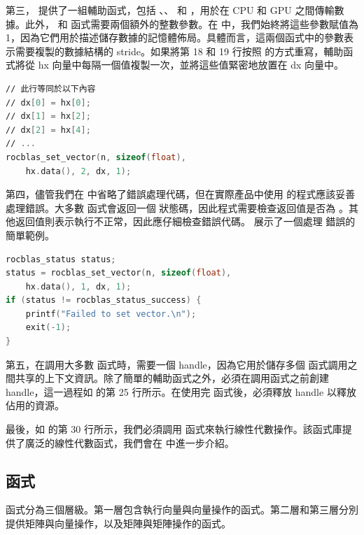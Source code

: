 第三， 提供了一組輔助函式，包括 、、 和 ，用於在 CPU 和 GPU 之間傳輸數據。此外， 和  函式需要兩個額外的整數參數。在  中，我們始終將這些參數賦值為 1，因為它們用於描述儲存數據的記憶體佈局。具體而言，這兩個函式中的參數表示需要複製的數據結構的 stride。如果將第 18 和 19 行按照  的方式重寫，輔助函式將從 hx 向量中每隔一個值複製一次，並將這些值緊密地放置在 dx 向量中。

\begin{lstlisting}[language=C, caption={使用不同值的範例。}, captionpos=t, label={lst:different}]
∕∕ 此行等同於以下內容
∕∕ dx[0] = hx[0];
∕∕ dx[1] = hx[2];
∕∕ dx[2] = hx[4];
∕∕ ...
rocblas_set_vector(n, sizeof(float),
    hx.data(), 2, dx, 1);
\end{lstlisting}

第四，儘管我們在  中省略了錯誤處理代碼，但在實際產品中使用  的程式應該妥善處理錯誤。大多數  函式會返回一個  狀態碼，因此程式需要檢查返回值是否為 。其他返回值則表示執行不正常，因此應仔細檢查錯誤代碼。 展示了一個處理  錯誤的簡單範例。

\begin{lstlisting}[language=C, caption={處理 \term{rocBLAS} API 錯誤的範例。}, captionpos=t, label={lst:APIerror}]
rocblas_status status;
status = rocblas_set_vector(n, sizeof(float),
    hx.data(), 1, dx, 1);
if (status != rocblas_status_success) {
    printf("Failed to set vector.\n");
    exit(-1);
}
\end{lstlisting}

第五，在調用大多數  函式時，需要一個 handle，因為它用於儲存多個  函式調用之間共享的上下文資訊。除了簡單的輔助函式之外，必須在調用函式之前創建 handle，這一過程如  的第 25 行所示。在使用完  函式後，必須釋放 handle 以釋放佔用的資源。

最後，如  的第 30 行所示，我們必須調用  函式來執行線性代數操作。該函式庫提供了廣泛的線性代數函式，我們會在  中進一步介紹。

\subsection{ 函式} \label{sec:rocBLAS_function}
 函式分為三個層級。第一層包含執行向量與向量操作的函式。第二層和第三層分別提供矩陣與向量操作，以及矩陣與矩陣操作的函式。

